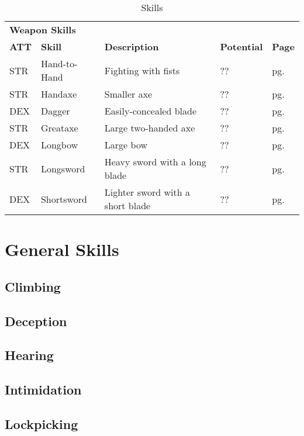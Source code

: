 \begin{table}[h!]
\begin{tabular}{l l l l l}
        \multicolumn{5}{l}{\bfseries{Weapon Skills}} \\
        \bfseries{ATT} & \bfseries{Skill} & \bfseries{Description} & \bfseries{Potential} & \bfseries{Page} \\
        STR & Hand-to-Hand & Fighting with fists & ?? & pg. \pageref{skill:hand-to-hand} \\
        STR & Handaxe & Smaller axe & ?? & pg. \pageref{skill:handaxe} \\
        DEX & Dagger & Easily-concealed blade & ?? & pg. \pageref{skill:dagger} \\
        STR & Greataxe & Large two-handed axe & ?? & pg. \pageref{skill:greataxe} \\
        DEX & Longbow & Large bow & ?? & pg. \pageref{skill:longbow} \\
        STR & Longsword & Heavy sword with a long blade & ?? & pg. \pageref{skill:longsword} \\
        DEX & Shortsword & Lighter sword with a short blade & ?? & pg. \pageref{skill:shortsword} \\
    \end{tabular}
    \caption{Skills}
    \label{tab:skills}
\end{table}

\section{General Skills}

\subsection{Climbing}\label{skill:climbing}

\subsection{Deception}\label{skill:deception}

\subsection{Hearing}\label{skill:hearing}

\subsection{Intimidation}\label{skill:intimidation}

\subsection{Lockpicking}\label{skill:lockpicking}

